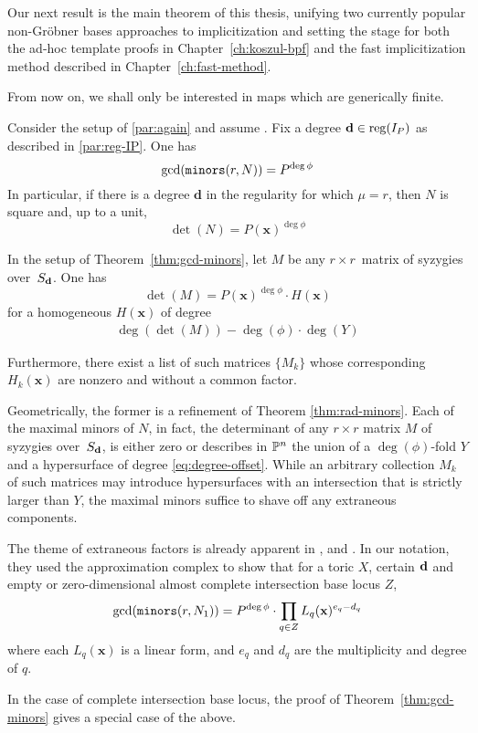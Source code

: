 \documentclass[fleqn,reqno]{amsart}
\numberwithin{first}{chapter}
\begin{document}
\begin{paragraf*}
Our next result is the main theorem of this thesis, unifying two currently
popular non-Gr\"{o}bner bases approaches to implicitization and setting the stage for both
the ad-hoc template proofs in Chapter~\ref{ch:koszul-bpf} and
the fast implicitization method described in Chapter~\ref{ch:fast-method}.

From now on, we shall only be interested in maps which are generically finite.
\end{paragraf*}

\begin{theorem}
\label{thm:gcd-minors}
Consider the setup of \eqref{par:again} and assume .
Fix a degree $\mathbf d\in\operatorname{reg}(I_P)$ as described in \eqref{par:reg-IP}.
One has
\[
	\gcd(\mathop{\tt minors}(r, N))=P^{\deg\phi}
\]
In particular, if there is a degree $\mathbf d$ in the regularity for which $\mu=r$,
then $N$ is square and, up to a unit,
\[
	\det(N)=P(\mathbf x)^{\deg\phi}
\]
\end{theorem}

\begin{corollary}
\label{thm:detM}
In the setup of Theorem~\ref{thm:gcd-minors},
let $M$ be any $r\times r$~matrix of syzygies over~$S_\mathbf d$. One has
\[
	\det(M)=P(\mathbf x)^{\deg\phi}\cdot H(\mathbf x)
\]
for a homogeneous $H(\mathbf x)$ of degree
\begin{align}
\label{eq:degree-offset}
\deg(\det(M))-\deg(\phi)\cdot\deg(Y)
\end{align}

Furthermore, there exist a list of such matrices $\{M_k\}$ whose
corresponding $H_k(\mathbf x)$ are nonzero and without a common factor.
\end{corollary}

\begin{paragraf*}
Geometrically, the former is a refinement of Theorem \ref{thm:rad-minors}.
Each of the maximal minors of $N$, in fact,
the determinant of any $r\times r$ matrix $M$ of syzygies over~$S_\mathbf d$, is either zero
or describes in $\mathbb{P}^n$ the union of a $\deg(\phi)$-fold $Y$ and
a hypersurface of degree \eqref{eq:degree-offset}.
While an arbitrary collection $M_k$ of such matrices may introduce hypersurfaces
with an intersection that is strictly larger than $Y$,
the maximal minors suffice to shave off any extraneous components.

The theme of extraneous factors is already apparent in
\citet{BCD-03}, \citet{BCJ-09} and \citet{BDD-09}.
In our notation, they used the approximation complex to show that for a toric $X$,
certain $\mathbf d$ and empty or zero-dimensional almost complete intersection base locus $Z$,
\[
	\gcd(\mathop{\tt minors}(r,N_1))=P^{\deg\phi}\cdot\prod_{q\in Z} L_q(\mathbf x)^{e_q-d_q}
\]
where each $L_q(\mathbf x)$ is a linear form, and
$e_q$ and $d_q$ are the multiplicity and degree of $q$.

In the case of complete intersection base locus, the proof of Theorem~\ref{thm:gcd-minors}
gives a special case of the above.
\end{paragraf*}
\end{document}
